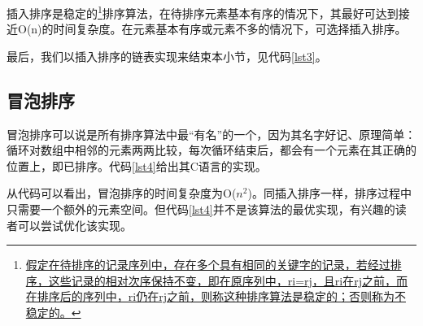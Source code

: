 \documentclass[a4paper, 12pt, titlepage]{article}
\newlength{\du}
\begin{document}
\begin{figure}[H]
\begin{center}
  \end{center}
  \caption{}
  \label{fig7}
\end{figure}

插入排序是稳定的\footnote{\href{http://baike.baidu.com/view/547325.htm?fr=aladdin}{假定在待排序的记录序列中，存在多个具有相同的关键字的记录，若经过排序，这些记录的相对次序保持不变，即在原序列中，ri=rj，且ri在rj之前，而在排序后的序列中，ri仍在rj之前，则称这种排序算法是稳定的；否则称为不稳定的。}}排序算法，在待排序元素基本有序的情况下，其最好可达到接近O(n)的时间复杂度。在元素基本有序或元素不多的情况下，可选择插入排序。

最后，我们以插入排序的链表实现来结束本小节，见代码\ref{lst3}。
\begin{spacing}{1.0}
  
\end{spacing}

\subsection{冒泡排序}
冒泡排序可以说是所有排序算法中最“有名”的一个，因为其名字好记、原理简单：循环对数组中相邻的元素两两比较，每次循环结束后，都会有一个元素在其正确的位置上，即已排序。代码\ref{lst4}给出其C语言的实现。
\begin{spacing}{1.0}
  
\end{spacing}

从代码可以看出，冒泡排序的时间复杂度为O($n^2$)。同插入排序一样，排序过程中只需要一个额外的元素空间。但代码\ref{lst4}并不是该算法的最优实现，有兴趣的读者可以尝试优化该实现。
\end{document}
